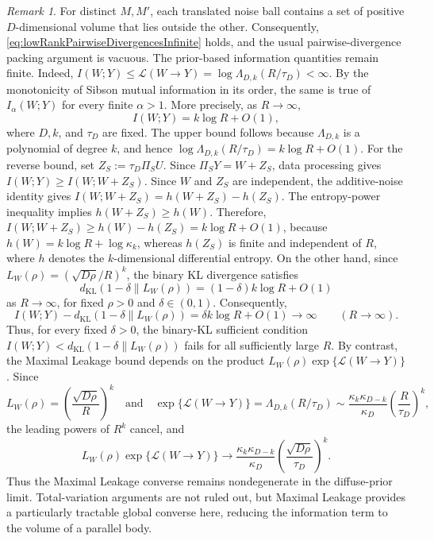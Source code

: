 \documentclass[11pt]{article}
\theoremstyle{definition}
\theoremstyle{remark}
\newtheorem{remark}[theorem]{Remark}
\newcommand{\1}{\boldsymbol{1}}
\newcommand{\ml}[2]{\mathcal{L}(#1\!\to\!#2)}
\begin{document}
\begin{remark}
\label{rmk:lowRankNonKL}
For distinct \(M,M'\), each translated noise ball contains a set of
positive \(D\)-dimensional volume that lies outside the other.
Consequently, \eqref{eq:lowRankPairwiseDivergencesInfinite} holds, and
the usual pairwise-divergence packing argument is vacuous. The prior-based information quantities remain finite. Indeed,
\(I(W;Y)\le\ml{W}{Y}=\log\Lambda_{D,k}(R/\tau_D)<\infty\).
By the monotonicity of Sibson mutual information in its order, the same is true
of \(I_\alpha(W;Y)\) for every finite \(\alpha>1\). More precisely, as
\(R\to\infty\),
\begin{equation}
I(W;Y)=k\log R+O(1),
\label{eq:lowRankShannonGrowth}
\end{equation}
where \(D,k\), and \(\tau_D\) are fixed. The upper bound follows because \(\Lambda_{D,k}\) is a polynomial of
degree \(k\), and hence
\(\log\Lambda_{D,k}(R/\tau_D)=k\log R+O(1)\). For the reverse bound, set
\(Z_S:=\tau_D\Pi_SU\). Since \(\Pi_SY=W+Z_S\), data processing gives
\(I(W;Y)\ge I(W;W+Z_S)\).
Since \(W\) and \(Z_S\) are independent, the additive-noise identity
gives \(I(W;W+Z_S)=h(W+Z_S)-h(Z_S)\).
The entropy-power inequality implies \(h(W+Z_S)\ge h(W)\). Therefore,
\(I(W;W+Z_S)\ge h(W)-h(Z_S)=k\log R+O(1)\),
because \(h(W)=k\log R+\log\kappa_k\), whereas \(h(Z_S)\) is finite and
independent of \(R\), where \(h\) denotes the \(k\)-dimensional differential entropy. On the other hand, since
\(L_W(\rho)=(\sqrt{D\rho}/R)^k\), the binary KL divergence satisfies
\begin{equation}
d_{\mathrm{KL}}
\left(1-\delta\middle\|L_W(\rho)\right)
=
(1-\delta)k\log R+O(1)
\label{eq:lowRankBinaryKLGrowth}
\end{equation}
as \(R\to\infty\), for fixed \(\rho>0\) and
\(\delta\in(0,1)\). Consequently,
\[I(W;Y)
-
d_{\mathrm{KL}}
\left(1-\delta\middle\|L_W(\rho)\right)
=
\delta k\log R+O(1)
\longrightarrow\infty
\qquad (R\to\infty).\]
Thus, for every fixed \(\delta>0\), the binary-KL sufficient condition
\(I(W;Y)<d_{\mathrm{KL}}(1-\delta\|L_W(\rho))\)
fails for all sufficiently large \(R\). By contrast, the Maximal Leakage bound depends on the product
\(L_W(\rho)\exp\{\ml{W}{Y}\}\). Since
\[
L_W(\rho)
=
\left(\frac{\sqrt{D\rho}}{R}\right)^k
\quad\text{and}\quad
\exp\{\ml{W}{Y}\}
=
\Lambda_{D,k}(R/\tau_D)
\sim
\frac{\kappa_k\kappa_{D-k}}{\kappa_D}
\left(\frac{R}{\tau_D}\right)^k,
\]
the leading powers of \(R^k\) cancel, and
\[
L_W(\rho)\exp\{\ml{W}{Y}\}
\longrightarrow
\frac{\kappa_k\kappa_{D-k}}{\kappa_D}
\left(\frac{\sqrt{D\rho}}{\tau_D}\right)^k.
\]
Thus the Maximal Leakage converse remains nondegenerate in the
diffuse-prior limit. Total-variation arguments are not ruled out, but
Maximal Leakage provides a particularly tractable global converse here,
reducing the information term to the volume of a parallel body.
\end{remark}
\end{document}
